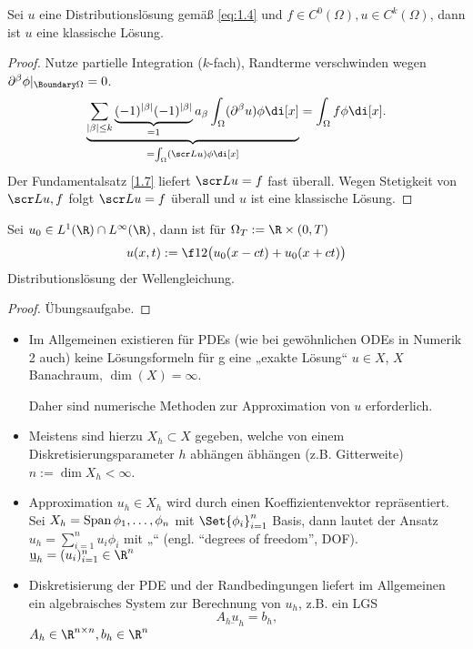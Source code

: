 \begin{st} \label{1.28}
	Sei $u$ eine Distributionslösung gemäß \eqref{eq:1.4} und $f \in C^0(\Omega), u \in C^k(\Omega)$, dann ist $u$ eine klassische Lösung.
	\begin{proof}
		Nutze partielle Integration ($k$-fach), Randterme verschwinden wegen $\partial^\beta \phi |_{\Boundary \Omega} = 0$.
		\[
			\underbrace{\sum_{|\beta|\le k} \underbrace{(-1)^{|\beta|} (-1)^{|\beta|}}_{=1} a_\beta \int_\Omega (\partial^\beta u) \phi \di[x]}_{= \int_\Omega (\scr L u) \phi \di[x]}
			= \int_\Omega f \phi \di[x].
		\]
		Der Fundamentalsatz \ref{1.7} liefert $\scr L u = f$ fast überall.
		Wegen Stetigkeit von $\scr L u, f$ folgt $\scr L u = f$ überall und $u$ ist eine klassische Lösung.
	\end{proof}
\end{st}

\begin{st} \label{1.29}
	Sei $u_0 \in L^1(\R) \cap L^\infty(\R)$, dann ist für $\Omega_T := \R \times (0,T)$
	\[
		u(x,t) := \f 12 \big( u_0(x-ct) + u_0(x+ct) \big)
	\]
	Distributionslösung der Wellengleichung.
	\begin{proof}
		Übungsaufgabe.
	\end{proof}
\end{st}

\begin{nt*}
	\begin{itemize}
		\item
			Im Allgemeinen existieren für PDEs (wie bei gewöhnlichen ODEs in Numerik 2 auch) keine Lösungsformeln für g eine „exakte Lösung“ $u \in X$, $X$ Banachraum, $\dim(X) = \infty$.

			Daher sind numerische Methoden zur Approximation von $u$ erforderlich.
		\item
			Meistens sind hierzu  $X_h \subset X$ gegeben, welche von einem Diskretisierungsparameter $h$ abhängen äbhängen (z.B. Gitterweite) $n := \dim X_h < \infty$.
		\item
			Approximation $u_h \in X_h$ wird durch einen Koeffizientenvektor repräsentiert.
			Sei $X_h = \operatorname{Span}{\phi_1, \dotsc, \phi_n}$ mit $\Set{\phi_i}_{i=1}^n$ Basis, dann lautet der Ansatz $u_h = \sum_{i=1}^n u_i \phi_i$ mit „“ (engl. “degrees of freedom”, DOF).
			$\underbar{u}_h = (u_i)_{i=1}^n \in \R^n$
		\item
			Diskretisierung der PDE und der Randbedingungen liefert im Allgemeinen ein algebraisches System zur Berechnung von $u_h$, z.B. ein LGS
			\[
				A_h \underbar{u}_h = b_h,
			\]
			$A_h \in \R^{n\times n}, b_h \in \R^n$
	\end{itemize}
\end{nt*}

